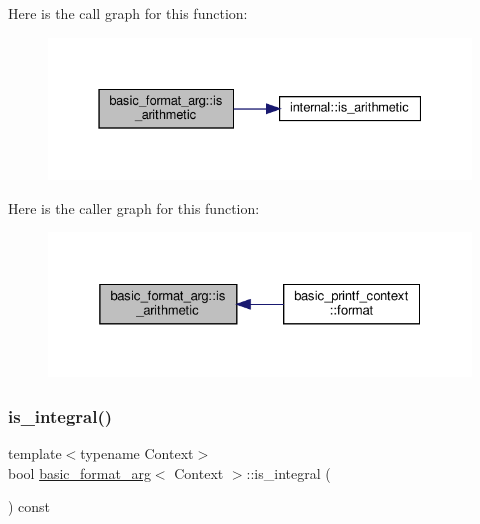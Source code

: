 Here is the call graph for this function\+:
\nopagebreak
\begin{figure}[H]
\begin{center}
\leavevmode
\includegraphics[width=331pt]{classbasic__format__arg_a14c5f1e0b933900dbc2d6fe1b6fd5ae1_cgraph}
\end{center}
\end{figure}
Here is the caller graph for this function\+:
\nopagebreak
\begin{figure}[H]
\begin{center}
\leavevmode
\includegraphics[width=325pt]{classbasic__format__arg_a14c5f1e0b933900dbc2d6fe1b6fd5ae1_icgraph}
\end{center}
\end{figure}
\mbox{\label{classbasic__format__arg_af7036c26bebf95df5766215ec9c1ec06}} 
\subsubsection{\texorpdfstring{is\+\_\+integral()}{is\_integral()}}
{\footnotesize\ttfamily template$<$typename Context$>$ \\
bool \hyperlink{classbasic__format__arg}{basic\+\_\+format\+\_\+arg}$<$ Context $>$\+::is\+\_\+integral (\begin{DoxyParamCaption}{ }\end{DoxyParamCaption}) const\hspace{0.3cm}{\ttfamily [inline]}}



